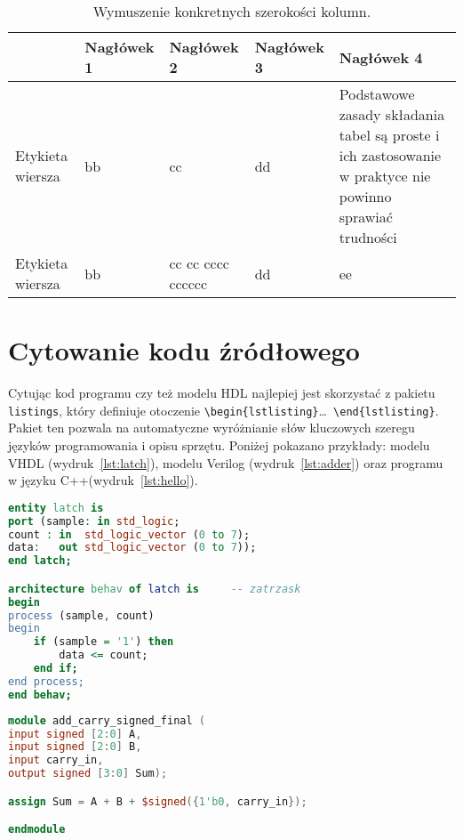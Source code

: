 \begin{table}[!h]
\caption{Wymuszenie konkretnych  szerokości kolumn.}
\centering
\begin{tabular}{|l|l|p{25mm}|l|p{3cm}|}
\hline & Nagłówek 1  & Nagłówek 2  & Nagłówek 3  &  Nagłówek 4  \\ 
\hline
\hline  Etykieta wiersza & bb  & cc  & dd   &  Podstawowe zasady składania tabel są proste i ich zastosowanie w praktyce nie powinno sprawiać trudności \\
\hline  Etykieta wiersza  & bb  & cc cc cccc cccccc  & dd   &  ee \\ 
\hline 
\end{tabular} 
\label{tab:tab1}
\end{table}


\newpage
\section{Cytowanie kodu źródłowego}
Cytując kod programu czy też modelu HDL najlepiej jest skorzystać z pakietu \texttt{listings}, który definiuje otoczenie  \texttt{\textbackslash begin\{lstlisting\}}\dots\texttt{ \textbackslash end\{lstlisting\}}. Pakiet ten pozwala na automatyczne wyróżnianie słów kluczowych szeregu języków  programowania i opisu sprzętu. Poniżej pokazano przykłady: modelu VHDL (wydruk~\ref{lst:latch}), modelu Verilog (wydruk~\ref{lst:adder}) oraz programu w języku C++(wydruk~\ref{lst:hello}).

  
\begin{lstlisting}[language=VHDL, caption={Przykładowy model VHDL}, label={lst:latch}]
entity latch is
port (sample: in std_logic;
count : in  std_logic_vector (0 to 7);
data:   out std_logic_vector (0 to 7));
end latch;

architecture behav of latch is     -- zatrzask
begin
process (sample, count)
begin
	if (sample = '1') then
		data <= count;
	end if;
end process;
end behav;
\end{lstlisting}



\begin{lstlisting}[language=Verilog, caption={Przykładowy model Verilog}, label={lst:adder}]
module add_carry_signed_final (
input signed [2:0] A,
input signed [2:0] B,
input carry_in,
output signed [3:0] Sum);

assign Sum = A + B + $signed({1'b0, carry_in});

endmodule
\end{lstlisting}


